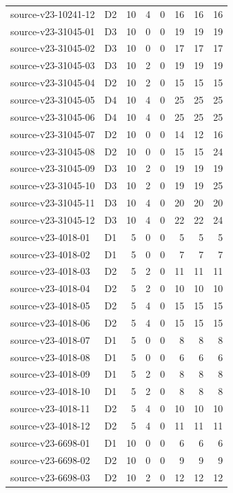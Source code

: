 \begin{longtable}{p{}lrrrrrr}
source-v23-10241-12 & D2 & 10 & 4 & 0 & 16 & 16 & 16\\
source-v23-31045-01 & D3 & 10 & 0 & 0 & 19 & 19 & 19\\
source-v23-31045-02 & D3 & 10 & 0 & 0 & 17 & 17 & 17\\
source-v23-31045-03 & D3 & 10 & 2 & 0 & 19 & 19 & 19\\
source-v23-31045-04 & D2 & 10 & 2 & 0 & 15 & 15 & 15\\
source-v23-31045-05 & D4 & 10 & 4 & 0 & 25 & 25 & 25\\
source-v23-31045-06 & D4 & 10 & 4 & 0 & 25 & 25 & 25\\
source-v23-31045-07 & D2 & 10 & 0 & 0 & 14 & 12 & 16\\
source-v23-31045-08 & D2 & 10 & 0 & 0 & 15 & 15 & 24\\
source-v23-31045-09 & D3 & 10 & 2 & 0 & 19 & 19 & 19\\
source-v23-31045-10 & D3 & 10 & 2 & 0 & 19 & 19 & 25\\
source-v23-31045-11 & D3 & 10 & 4 & 0 & 20 & 20 & 20\\
source-v23-31045-12 & D3 & 10 & 4 & 0 & 22 & 22 & 24\\
source-v23-4018-01 & D1 & 5 & 0 & 0 & 5 & 5 & 5\\
source-v23-4018-02 & D1 & 5 & 0 & 0 & 7 & 7 & 7\\
source-v23-4018-03 & D2 & 5 & 2 & 0 & 11 & 11 & 11\\
source-v23-4018-04 & D2 & 5 & 2 & 0 & 10 & 10 & 10\\
source-v23-4018-05 & D2 & 5 & 4 & 0 & 15 & 15 & 15\\
source-v23-4018-06 & D2 & 5 & 4 & 0 & 15 & 15 & 15\\
source-v23-4018-07 & D1 & 5 & 0 & 0 & 8 & 8 & 8\\
source-v23-4018-08 & D1 & 5 & 0 & 0 & 6 & 6 & 6\\
source-v23-4018-09 & D1 & 5 & 2 & 0 & 8 & 8 & 8\\
source-v23-4018-10 & D1 & 5 & 2 & 0 & 8 & 8 & 8\\
source-v23-4018-11 & D2 & 5 & 4 & 0 & 10 & 10 & 10\\
source-v23-4018-12 & D2 & 5 & 4 & 0 & 11 & 11 & 11\\
source-v23-6698-01 & D1 & 10 & 0 & 0 & 6 & 6 & 6\\
source-v23-6698-02 & D2 & 10 & 0 & 0 & 9 & 9 & 9\\
source-v23-6698-03 & D2 & 10 & 2 & 0 & 12 & 12 & 12\\

\end{longtable}
